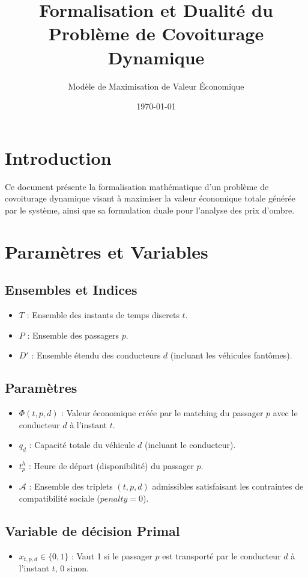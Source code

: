 \documentclass[12pt]{article}
\title{Formalisation et Dualité du Problème de Covoiturage Dynamique}
\author{Modèle de Maximisation de Valeur Économique}
\date{\today}
\begin{document}
\maketitle

\section{Introduction}
Ce document présente la formalisation mathématique d'un problème de covoiturage dynamique visant à maximiser la valeur économique totale générée par le système, ainsi que sa formulation duale pour l'analyse des prix d'ombre.

\section{Paramètres et Variables}

\subsection{Ensembles et Indices}
\begin{itemize}
    \item $T$ : Ensemble des instants de temps discrets $t$.
    \item $P$ : Ensemble des passagers $p$.
    \item $D'$ : Ensemble étendu des conducteurs $d$ (incluant les véhicules fantômes).
\end{itemize}

\subsection{Paramètres}
\begin{itemize}
    \item $\Phi(t, p, d)$ : Valeur économique créée par le matching du passager $p$ avec le conducteur $d$ à l'instant $t$.
    \item $q_d$ : Capacité totale du véhicule $d$ (incluant le conducteur).
    \item $t_p^h$ : Heure de départ (disponibilité) du passager $p$.
    \item $\mathcal{A}$ : Ensemble des triplets $(t, p, d)$ admissibles satisfaisant les contraintes de compatibilité sociale ($penalty = 0$).
\end{itemize}

\subsection{Variable de décision Primal}
\begin{itemize}
    \item $x_{t,p,d} \in \{0, 1\}$ : Vaut 1 si le passager $p$ est transporté par le conducteur $d$ à l'instant $t$, 0 sinon.
\end{itemize}
\end{document}

